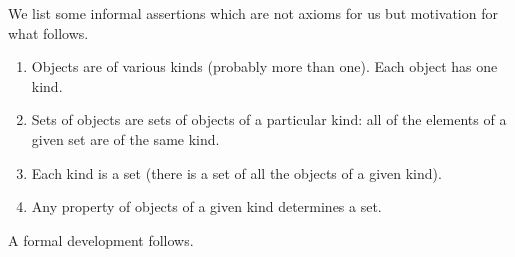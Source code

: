 \documentclass[12pt]{article}
\begin{document}
We list some informal assertions which are not axioms for us but motivation for what follows.

\begin{enumerate}

\item  Objects are of various kinds (probably more than one).  Each object has one kind.

\item  Sets of objects are sets of objects of a particular kind:  all of the elements of a given set are of the same kind.

\item  Each kind is a set (there is a set of all the objects of a given kind).

\item  Any property of objects of a given kind determines a set.

\end{enumerate}


A formal development follows.
\end{document}
